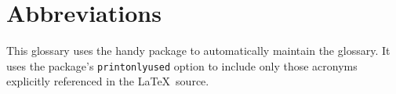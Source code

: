 
\chapter{Abbreviations}

This glossary uses the handy  package to automatically
maintain the glossary.  It uses the package's \texttt{printonlyused}
option to include only those acronyms explicitly referenced in the
\LaTeX\ source.


